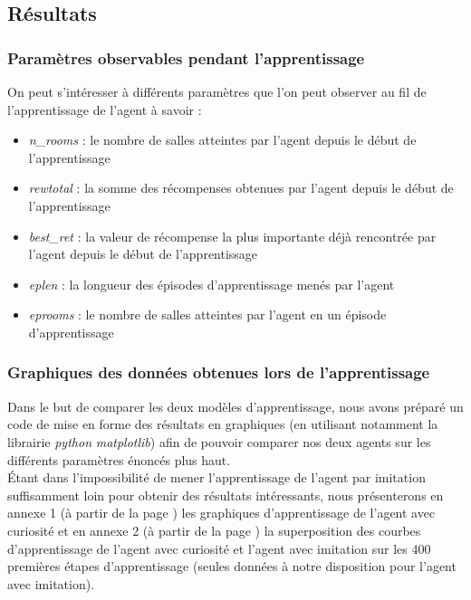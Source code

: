 \documentclass[a4paper,12pt]{report}
\begin{document}
\subsection{Résultats}
\subsubsection{Paramètres observables pendant l'apprentissage}
On peut s'intéresser à différents paramètres que l'on peut observer au fil de l'apprentissage de l'agent à savoir :
\begin{itemize}
    \item \textit{n\_rooms} : le nombre de salles atteintes par l'agent depuis le début de l'apprentissage
    \item \textit{rewtotal} : la somme des récompenses obtenues par l'agent depuis le début de l'apprentissage
    \item \textit{best\_ret} : la valeur de récompense la plus importante déjà rencontrée par l'agent depuis le début de l'apprentissage
    \item \textit{eplen} : la longueur des épisodes d'apprentissage menés par l'agent
    \item \textit{eprooms} : le nombre de salles atteintes par l'agent en un épisode d'apprentissage
\end{itemize}

\subsubsection{Graphiques des données obtenues lors de l'apprentissage}
\indent Dans le but de comparer les deux modèles d'apprentissage, nous avons préparé un code de mise en forme des résultats en graphiques (en utilisant notamment la librairie \textit{python} \textit{matplotlib}) afin de pouvoir comparer nos deux agents sur les différents paramètres énoncés plus haut.\\

\indent Étant dans l'impossibilité de mener l'apprentissage de l'agent par imitation suffisamment loin pour obtenir des résultats intéressants, nous présenterons en annexe 1 (à partir de la page \pageref{annexe_1}) les graphiques d'apprentissage de l'agent avec curiosité et en annexe 2 (à partir de la page \pageref{annexe_2}) la superposition des courbes d'apprentissage de l'agent avec curiosité et l'agent avec imitation sur les 400 premières étapes d'apprentissage (seules données à notre disposition pour l'agent avec imitation).\\
\end{document}
